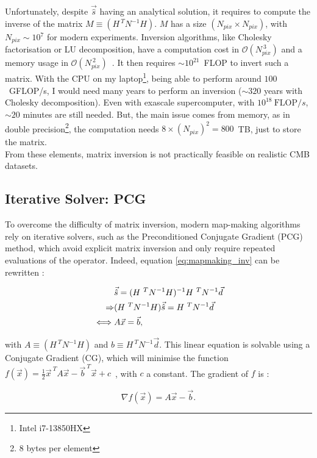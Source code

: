 \documentclass[../../thesis.tex]{subfiles}
\begin{document}
Unfortunately, despite $\vec{\hat{s}}$ having an analytical solution, it requires to compute the inverse of the matrix $M \equiv (H^{~T} N^{-1} H)$. $M$ has a size $(N_{pix} \times N_{pix})$, with $N_{pix} \sim 10^7$ for modern experiments. Inversion algorithms, like Cholesky factorisation or LU decomposition, have a computation cost in $\mathcal{O}(N_{pix}^{~3})$ and a memory usage in $\mathcal{O}(N_{pix}^{~2})$~\cite{golub13}. It then requires $\sim 10^{21}$~FLOP to invert such a matrix. With the CPU on my laptop\footnote{Intel i7-13850HX}, being able to perform around $100$~GFLOP/s, I would need many years to perform an inversion ($\sim 320$ years with Cholesky decomposition). Even with exascale supercomputer, with $10^{18}~\mathrm{FLOP}/s$, $\sim 20$ minutes are still needed. But, the main issue comes from memory, as in double precision\footnote{8 bytes per element}, the computation needs $8 \times (N_{pix})^2 = 800$~TB, just to store the matrix. \\
From these elements, matrix inversion is not practically feasible on realistic CMB datasets.

\subsection{Iterative Solver: PCG} \label{sub:pcg_solver}

To overcome the difficulty of matrix inversion, modern map-making algorithms rely on iterative solvers, such as the Preconditioned Conjugate Gradient (PCG) method, which avoid explicit matrix inversion and only require repeated evaluations of the operator. Indeed, equation \ref{eq:mapmaking_inv} can be rewritten : 

\begin{align} \label{eq:mapmaking}
    & \vec{\hat{s}} = (H^{~T} N^{-1} H)^{-1} H^{~T} N^{-1} \vec{d} \notag \\
    \Rightarrow & (H^{~T}N^{-1}H)\vec{\hat{s}} = H^{~T} N^{-1} \vec{d} \notag \\
    \iff & A\vec{x} = \vec{b},
\end{align}

with $A \equiv (H^{~T}N^{-1}H)$ and $b \equiv H^{~T} N^{-1} \vec{d}$. This linear equation is solvable using a Conjugate Gradient (CG), which will minimise the function $f(\vec{x}) = \frac{1}{2}\vec{x}^{~T}A\vec{x} - \vec{b}^{~T}\vec{x} + c$~\cite{liu2023}, with $c$ a constant. The gradient of $f$ is : 

\begin{equation}
    \nabla f(\vec{x}) = A\vec{x} - \vec{b}.
\end{equation}
\end{document}
